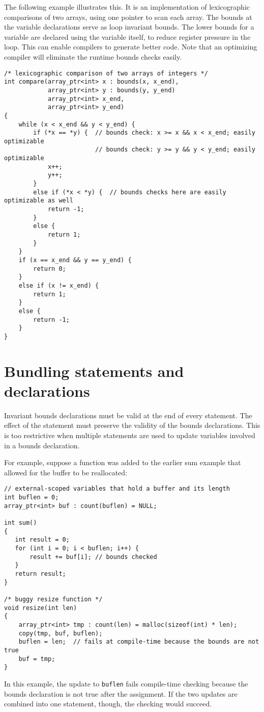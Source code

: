 The following example illustrates this. It is an implementation of
lexicographic comparisons of two arrays, using one pointer to scan each
array. The bounds at the variable declarations serve as loop invariant
bounds. The lower bounds for a variable are declared using the variable
itself, to reduce register pressure in the loop. This can enable
compilers to generate better code. Note that an optimizing compiler will
eliminate the runtime bounds checks easily.

\begin{verbatim}
/* lexicographic comparison of two arrays of integers */
int compare(array_ptr<int> x : bounds(x, x_end), 
            array_ptr<int> y : bounds(y, y_end)
            array_ptr<int> x_end,
            array_ptr<int> y_end)
{ 
    while (x < x_end && y < y_end) {
        if (*x == *y) {  // bounds check: x >= x && x < x_end; easily optimizable
                         // bounds check: y >= y && y < y_end; easily optimizable
            x++;
            y++;
        }
        else if (*x < *y) {  // bounds checks here are easily optimizable as well
            return -1;
        }
        else {
            return 1;
        }
    }
    if (x == x_end && y == y_end) {
        return 0;
    }
    else if (x != x_end) {
        return 1;
    }
    else {
        return -1; 
    }
}
\end{verbatim}

\section{Bundling statements and declarations}

Invariant bounds declarations must be valid at the end of every
statement. The effect of the statement must preserve the validity of the
bounds declarations. This is too restrictive when multiple statements
are used to update variables involved in a bounds declaration.

For example, suppose a function was added to the earlier sum example
that allowed for the buffer to be reallocated:
\begin{verbatim}
// external-scoped variables that hold a buffer and its length
int buflen = 0;
array_ptr<int> buf : count(buflen) = NULL;

int sum()
{
   int result = 0;
   for (int i = 0; i < buflen; i++) {
       result += buf[i]; // bounds checked
   }
   return result;
}

/* buggy resize function */
void resize(int len) 
{
    array_ptr<int> tmp : count(len) = malloc(sizeof(int) * len);
    copy(tmp, buf, buflen);
    buflen = len;  // fails at compile-time because the bounds are not true
    buf = tmp;
}
\end{verbatim}
In this example, the update to \texttt{buflen} fails compile-time
checking because the bounds declaration is not true after the
assignment. If the two updates are combined into one statement, though,
the checking would succeed.

